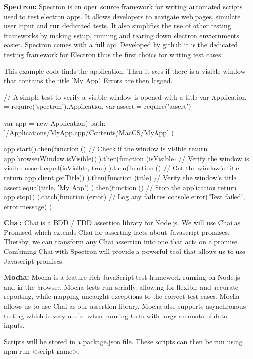 \textbf{Spectron:}
  Spectron is an open source framework for writing automated scripts used to test electron apps. It allows developers to navigate web pages, simulate user input and run dedicated tests. It also simplifies the use of other testing frameworks by making setup, running and tearing down electron enviornments easier. Spectron comes with a full api. Developed by github it is the dedicated testing framework for Electron thus the first choice for writing test cases.\newline

\par This example code finds the application. Then it sees if there is a visible window that contains the title 'My App'. Errors are then logged.

\begin{javascriptcode}
// A simple test to verify a visible window is opened with a title
var Application = require('spectron').Application
var assert = require('assert')

var app = new Application({
  path: '/Applications/MyApp.app/Contents/MacOS/MyApp'
})

app.start().then(function () {
  // Check if the window is visible
  return app.browserWindow.isVisible()
}).then(function (isVisible) {
  // Verify the window is visible
  assert.equal(isVisible, true)
}).then(function () {
  // Get the window's title
  return app.client.getTitle()
}).then(function (title) {
  // Verify the window's title
  assert.equal(title, 'My App')
}).then(function () {
  // Stop the application
  return app.stop()
}).catch(function (error) {
  // Log any failures
  console.error('Test failed', error.message)
})
\end{javascriptcode}
\newpage

\textbf{Chai:}
Chai is a BDD / TDD assertion library for Node.js. We will use Chai as Promised which extends Chai for asserting facts about Javascript promises. Thereby, we can transform any Chai assertion into one that acts on a promise. Combining Chai with Spectron will provide a powerful tool that allows us to use Javascript promises.

\vspace{10mm}

\textbf{Mocha:}
Mocha is a feature-rich JavaScript test framework running on Node.js and in the browser. Mocha tests run serially, allowing for flexible and accurate reporting, while mapping uncaught exceptions to the correct test cases. Mocha allows us to use Chai as our assertion library. Mocha also supports asynchronous testing which is very useful when running tests with large amounts of data inputs.

\par Scripts will be stored in a package.json file. These scripts can then be run using npm run <script-name>.
